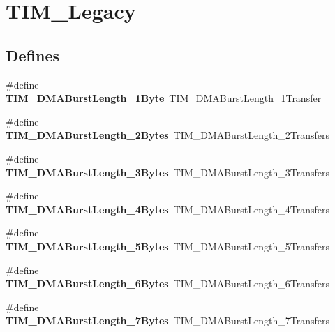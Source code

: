 \hypertarget{group__TIM__Legacy}{
\section{TIM\_\-Legacy}
\label{group__TIM__Legacy}
}
\subsection*{Defines}
\begin{DoxyCompactItemize}
\item 
\hypertarget{group__TIM__Legacy_gad915c67fae262b887f4f074809448309}{
\#define {\bfseries TIM\_\-DMABurstLength\_\-1Byte}~TIM\_\-DMABurstLength\_\-1Transfer}
\label{group__TIM__Legacy_gad915c67fae262b887f4f074809448309}

\item 
\hypertarget{group__TIM__Legacy_gabed2d89b663148923f4a7ca63d62d947}{
\#define {\bfseries TIM\_\-DMABurstLength\_\-2Bytes}~TIM\_\-DMABurstLength\_\-2Transfers}
\label{group__TIM__Legacy_gabed2d89b663148923f4a7ca63d62d947}

\item 
\hypertarget{group__TIM__Legacy_gad06dbc68a994da99b017a18a7197c0ad}{
\#define {\bfseries TIM\_\-DMABurstLength\_\-3Bytes}~TIM\_\-DMABurstLength\_\-3Transfers}
\label{group__TIM__Legacy_gad06dbc68a994da99b017a18a7197c0ad}

\item 
\hypertarget{group__TIM__Legacy_ga620ce560a1d7a6d6769cacd2a2ead48d}{
\#define {\bfseries TIM\_\-DMABurstLength\_\-4Bytes}~TIM\_\-DMABurstLength\_\-4Transfers}
\label{group__TIM__Legacy_ga620ce560a1d7a6d6769cacd2a2ead48d}

\item 
\hypertarget{group__TIM__Legacy_gaf9ac4a4cfd3dcfb7ba859898e702c881}{
\#define {\bfseries TIM\_\-DMABurstLength\_\-5Bytes}~TIM\_\-DMABurstLength\_\-5Transfers}
\label{group__TIM__Legacy_gaf9ac4a4cfd3dcfb7ba859898e702c881}

\item 
\hypertarget{group__TIM__Legacy_ga7a9cc659b4fc010a31815254f6b57e3f}{
\#define {\bfseries TIM\_\-DMABurstLength\_\-6Bytes}~TIM\_\-DMABurstLength\_\-6Transfers}
\label{group__TIM__Legacy_ga7a9cc659b4fc010a31815254f6b57e3f}

\item 
\hypertarget{group__TIM__Legacy_ga5833cc5442c40a97a6a90bcd34a2e773}{
\#define {\bfseries TIM\_\-DMABurstLength\_\-7Bytes}~TIM\_\-DMABurstLength\_\-7Transfers}
\label{group__TIM__Legacy_ga5833cc5442c40a97a6a90bcd34a2e773}


\end{DoxyCompactItemize}
